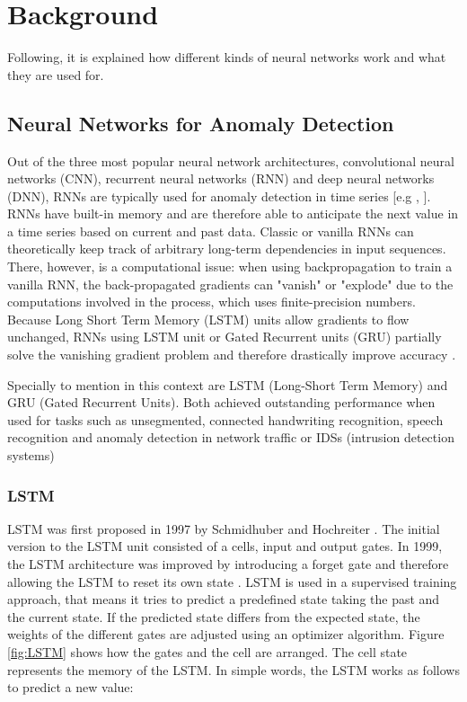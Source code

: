 \section{Background} \label{background}

Following, it is explained how different kinds of neural networks work and what they are used for.

\subsection{Neural Networks for Anomaly Detection} \label{NN}

Out of the three most popular neural network architectures, convolutional neural networks (CNN), recurrent neural networks (RNN) and deep neural networks (DNN), RNNs are typically used for anomaly detection in time series [e.g \parencite{Malhotra2015}, \parencite{Verner2019}]. RNNs have built-in memory and are therefore able to anticipate the next value in a time series based on current and past data. Classic or vanilla RNNs can theoretically keep track of arbitrary long-term dependencies in input sequences. There, however, is a computational issue: when using backpropagation to train a vanilla RNN, the back-propagated gradients can "vanish" or "explode" due to the computations involved in the process, which uses finite-precision numbers. Because Long Short Term Memory (LSTM) units allow gradients to flow unchanged, RNNs using LSTM unit or Gated Recurrent units (GRU) partially solve the vanishing gradient problem and therefore drastically improve accuracy \parencite{Hochreiter1997}.

Specially to mention in this context are LSTM (Long-Short Term Memory) and GRU (Gated Recurrent Units). Both achieved outstanding performance when used for tasks such as unsegmented, connected handwriting recognition, speech recognition and anomaly detection in network traffic or IDSs (intrusion detection systems) \parencite{JunyoungChung2014}

\subsubsection{LSTM} \label{LSTM}
LSTM was first proposed in 1997 by Schmidhuber and Hochreiter \parencite{Hochreiter1997}. The initial version to the LSTM unit consisted of a cells, input and output gates. In 1999, the LSTM architecture was improved by introducing a forget gate and therefore allowing the LSTM to reset its own state \parencite{Gers2000}. LSTM is used in a supervised training approach, that means it tries to predict a predefined state taking the past and the current state. If the predicted state differs from the expected state, the weights of the different gates are adjusted using an optimizer algorithm. Figure \ref{fig:LSTM} shows how the gates and the cell are arranged. The cell state represents the memory of the LSTM. In simple words, the LSTM works as follows to predict a new value: 

